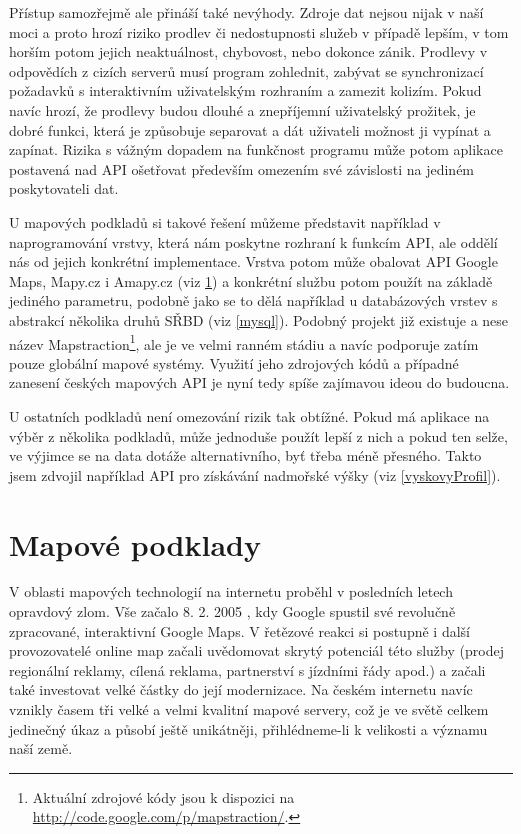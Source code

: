 Přístup samozřejmě ale přináší také nevýhody. Zdroje dat nejsou nijak
v naší moci a proto hrozí riziko prodlev či nedostupnosti služeb v
případě lepším, v tom horším potom jejich neaktuálnost, chybovost, nebo
dokonce zánik. Prodlevy v odpovědích z cizích serverů musí program
zohlednit, zabývat se synchronizací požadavků s interaktivním
uživatelským rozhraním a zamezit kolizím. Pokud navíc hrozí, že 
prodlevy budou dlouhé a znepříjemní uživatelský prožitek, je dobré
funkci, která je způsobuje separovat a dát uživateli možnost ji
vypínat a zapínat. Rizika s vážným dopadem na funkčnost programu může
potom aplikace postavená nad API ošetřovat především omezením své
závislosti na jediném poskytovateli dat.

U mapových podkladů si takové řešení můžeme představit například v
naprogramování vrstvy, která nám poskytne rozhraní k funkcím API,
ale oddělí nás od jejich konkrétní implementace. Vrstva potom může
obalovat API Google Maps, Mapy.cz i Amapy.cz (viz \ref{vybermap}) a
konkrétní službu potom použít na základě jediného parametru, podobně
jako se to dělá například u databázových vrstev s abstrakcí
několika druhů SŘBD (viz \ref{mysql}). Podobný projekt již existuje a
nese název Mapstraction\footnote{Aktuální zdrojové kódy jsou k dispozici na
\url{http://code.google.com/p/mapstraction/}.}, ale je ve velmi ranném stádiu a navíc podporuje zatím pouze globální
mapové systémy. Využití jeho zdrojových kódů a případné zanesení českých
mapových API je nyní tedy spíše zajímavou ideou do budoucna.

U ostatních podkladů není omezování rizik tak obtížné. Pokud má
aplikace na výběr z několika podkladů, může jednoduše použít lepší z
nich a pokud ten selže, ve výjimce se na data dotáže alternativního,
byť třeba méně přesného. Takto jsem zdvojil například API pro
získávání nadmořské výšky (viz \ref{vyskovyProfil}).

\section{Mapové podklady}\label{vybermap}
V oblasti mapových technologií na internetu proběhl v
posledních letech opravdový zlom. Vše začalo 8. 2.
2005 \cite{gmaps}, kdy Google spustil své revolučně zpracované,
interaktivní Google Maps. V řetězové reakci si postupně i další
provozovatelé online map začali uvědomovat skrytý potenciál této
služby (prodej regionální reklamy, cílená reklama, partnerství s
jízdními řády apod.) a začali také investovat velké částky do její
modernizace. Na českém internetu navíc vznikly časem tři velké a
velmi kvalitní mapové servery, což je ve světě celkem jedinečný úkaz
a působí ještě unikátněji, přihlédneme-li k velikosti a významu naší
země.

